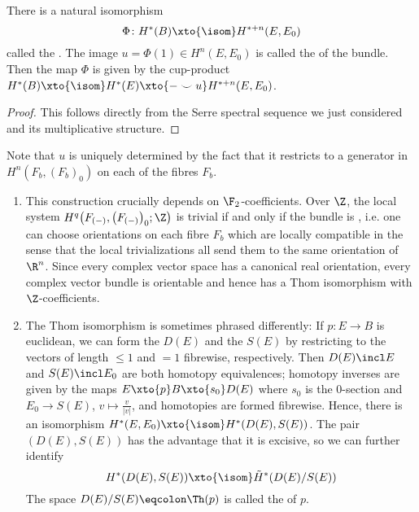 \begin{theorem}
	There is a natural isomorphism 
	\begin{equation*}
		\Phi\colon H^*(B) \xto{\isom} H^{* + n}(E, E_0)
	\end{equation*}
	called the .
	The image $u = \Phi(1) \in H^n(E, E_0)$ is called the  of the bundle.
	Then the map $\Phi$ is given by the cup-product $H^*(B) \xto{\isom} H^*(E) \xto{{{-}} \smile u} H^{* + n}(E, E_0)$.
\end{theorem}
\begin{proof}
	This follows directly from the Serre spectral sequence we just considered and its multiplicative structure.
\end{proof}
Note that $u$ is uniquely determined by the fact that it restricts to a generator in $H^n(F_b, (F_b)_0)$ on each of the fibres $F_b$.
\begin{remark}
	\leavevmode
	\begin{enumerate}
		\item This construction crucially depends on $\F_2$-coefficients.
			Over $\Z$, the local system $H^q\big(F_{({{-}})}, \big(F_{({{-}})}\big)_0; \Z\big)$ is trivial if and only if the bundle is , i.e. one can choose orientations on each fibre $F_b$ which are locally compatible in the sense that the local trivializations all send them to the same orientation of $\R^n$.
			Since every complex vector space has a canonical real orientation, every complex vector bundle is orientable and hence has a Thom isomorphism with $\Z$-coefficients.
		\item The Thom isomorphism is sometimes phrased differently:
			If $p\colon E \to B$ is euclidean, we can form the  $D(E)$ and the  $S(E)$ by restricting to the vectors of length $\leq 1$ and $= 1$ fibrewise, respectively.
			Then $D(E) \incl E$ and $S(E) \incl E_0$ are both homotopy equivalences; homotopy inverses are given by the maps $E \xto{p} B \xto{s_0} D(E)$ where $s_0$ is the 0-section and $E_0 \to S(E)$, $v \mapsto \frac{v}{|v|}$, and homotopies are formed fibrewise.
			Hence, there is an isomorphism $H^*(E, E_0) \xto{\isom} H^*(D(E), S(E))$.
			The pair $(D(E), S(E))$ has the advantage that it is excisive, so we can further identify
			\begin{equation*}
				H^*(D(E), S(E)) \xto{\isom} \tilde{H}^*(D(E) / S(E))
			\end{equation*}
			The space $D(E) / S(E) \eqcolon \Th(p)$ is called the  of $p$.
	\end{enumerate}
\end{remark}
